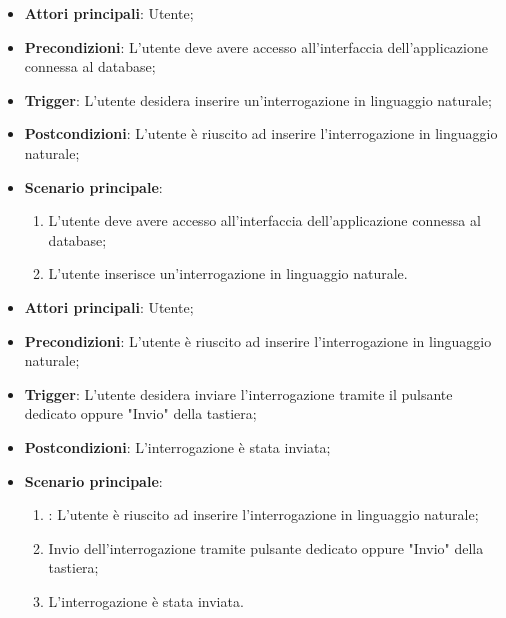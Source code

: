 \hypertarget{UC1.1}{}
\begin{itemize}
    \item \textbf{Attori principali}: Utente;
    \item \textbf{Precondizioni}: L'utente deve avere accesso all'interfaccia dell'applicazione connessa al database;
    \item \textbf{Trigger}: L'utente desidera inserire un'interrogazione in linguaggio naturale;
    \item \textbf{Postcondizioni}: L'utente è riuscito ad inserire l'interrogazione in linguaggio naturale;
    \item \textbf{Scenario principale}:
    \begin{enumerate}
        \item L'utente deve avere accesso all'interfaccia dell'applicazione connessa al database;
        \item L'utente inserisce un'interrogazione in linguaggio naturale.
    \end{enumerate}
\end{itemize}

\hypertarget{UC1.2}{}
\begin{itemize}
    \item \textbf{Attori principali}: Utente;
    \item \textbf{Precondizioni}: L'utente è riuscito ad inserire l'interrogazione in linguaggio naturale;
    \item \textbf{Trigger}: L'utente desidera inviare l'interrogazione tramite il pulsante dedicato oppure "Invio" della tastiera;
    \item \textbf{Postcondizioni}: L'interrogazione è stata inviata;
    \item \textbf{Scenario principale}:
    \begin{enumerate}
        \item {}: L'utente è riuscito ad inserire l'interrogazione in linguaggio naturale;
        \item Invio dell'interrogazione tramite pulsante dedicato oppure "Invio" della tastiera;
        \item L'interrogazione è stata inviata.
    \end{enumerate}
\end{itemize}

